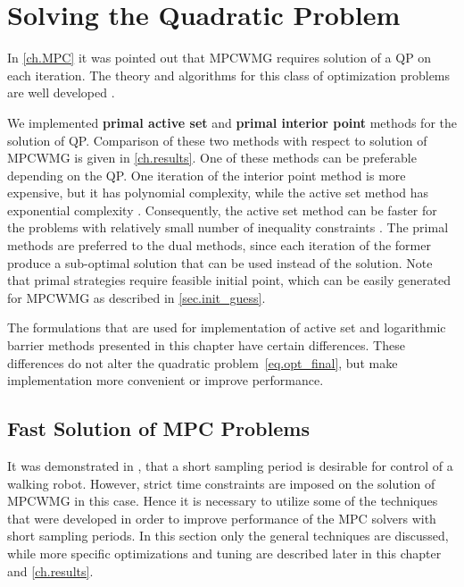 \chapter{Solving the Quadratic Problem}
\label{ch.QP}
In \cref{ch.MPC} it was pointed out that \ac{MPCWMG} requires solution of a \ac{QP}
on each iteration. The theory and algorithms for this class of optimization problems
are well developed \cite{NocedalNumOpt, BoydCVX}. 

We implemented {\bf primal active set} and {\bf primal interior point} methods for 
the solution of \ac{QP}. Comparison of these two methods with respect to solution 
of \ac{MPCWMG} is given in \cref{ch.results}. One of these methods can be preferable
depending on the \ac{QP}. One iteration of the interior point method is more expensive, 
but it has polynomial complexity, while the active set method has exponential complexity 
\cite{RaoIPMPC}. Consequently, the active set method can be faster for the problems
with relatively small number of inequality constraints \cite{BartlettASvsIP}. The 
primal methods are preferred to the dual methods, since each iteration of the former 
produce a sub-optimal solution that can be used instead of the solution. Note that 
primal strategies require feasible initial point, which can be easily generated for 
\ac{MPCWMG} as described in \cref{sec.init_guess}.

The formulations that are used for implementation of active set and logarithmic
barrier methods presented in this chapter have certain differences. These 
differences do not alter the quadratic problem~\eqref{eq.opt_final}, but make 
implementation more convenient or improve performance.



\section{Fast Solution of MPC Problems}
It was demonstrated in \cite{Nishiwaki}, that a short sampling period is desirable
for control of a walking robot. However, strict time constraints are imposed on
the solution of \ac{MPCWMG} in this case. Hence it is necessary to utilize some
of the techniques that were developed in order to improve performance of the 
\ac{MPC} solvers with short sampling periods. In this section only the general 
techniques are discussed, while more specific optimizations and tuning are described 
later in this chapter and \cref{ch.results}.

